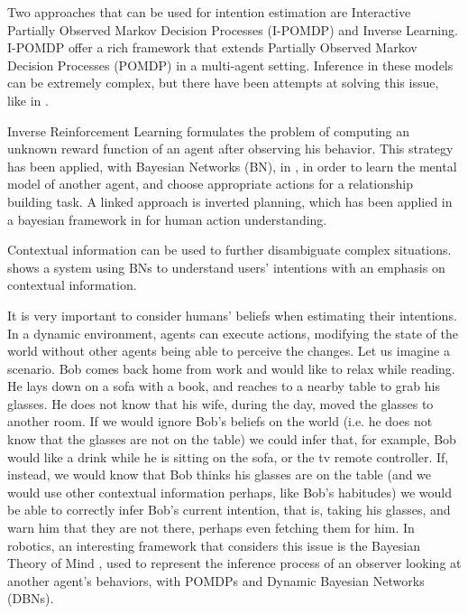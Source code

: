 Two approaches that can be used for intention estimation are Interactive Partially Observed Markov Decision Processes (I-POMDP) and Inverse Learning. I-POMDP  \cite{gmytrasiewicz2004interactive} offer a rich framework that extends Partially Observed Markov Decision Processes (POMDP) in a multi-agent setting. Inference in these models can be extremely complex, but there have been attempts at solving this issue, like in \cite{doshi2009monte,hoang2013interactive}. 

Inverse Reinforcement Learning \cite{ng2000algorithms} formulates the problem of computing an unknown reward function of an agent after observing his behavior. This strategy has been applied, with Bayesian Networks (BN), in \cite{Nagai2015}, in order to learn the mental model of another agent, and choose appropriate actions for a relationship building task. A linked approach is inverted planning, which has been applied in a bayesian framework in \cite{baker2009action}  for human action understanding.

Contextual information can be used to further disambiguate complex situations. \cite{Liu2014} shows a system using BNs to understand users' intentions with an emphasis on contextual information.

It is very important to consider humans' beliefs when estimating their intentions. In a dynamic environment, agents can execute actions, modifying the state of the world without other agents being able to perceive the changes. Let us imagine a scenario. Bob comes back home from work and would like to relax while reading. He lays down on a sofa with a book, and reaches to a nearby table to grab his glasses. He does not know that his wife, during the day, moved the glasses to another room. If we would ignore Bob's beliefs on the world (i.e. he does not know that the glasses are not on the table) we could infer that, for example, Bob would like a drink while he is sitting on the sofa, or the tv remote controller. If, instead, we would know that Bob thinks his glasses are on the table (and we would use other contextual information perhaps, like Bob's habitudes) we would be able to correctly infer Bob's current intention, that is, taking his glasses, and warn him that they are not there, perhaps even fetching them for him. In robotics, an interesting framework that considers this issue is the Bayesian Theory of Mind \cite{baker2014modeling}, used to represent the inference process of an observer looking at another agent's behaviors, with POMDPs and Dynamic Bayesian Networks (DBNs).


